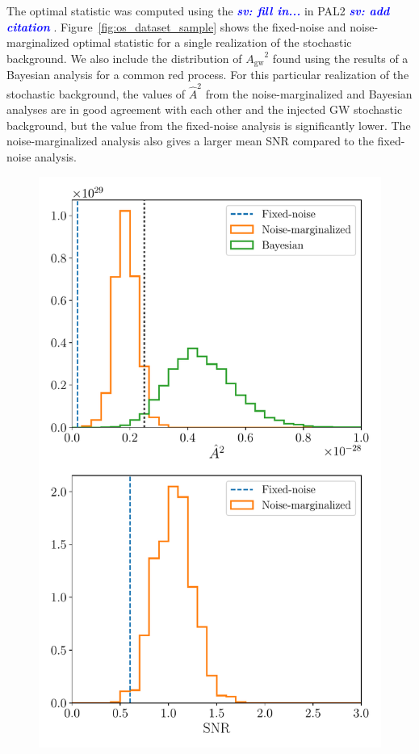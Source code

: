 \documentclass[twocolumn,aps,prd,superscriptaddress]{revtex4-1}
\newcommand{\sv}[1]{\textcolor{blue}{\it{\textbf{sv: #1}}} }
\newcommand{\Agw}{\ensuremath{A_\mathrm{gw}}}
\begin{document}
The optimal statistic was computed using the \sv{fill in...} in PAL2 \sv{add citation}. 
Figure~\ref{fig:os_dataset_sample} shows the fixed-noise and noise-marginalized 
optimal statistic for a single realization of the stochastic background. 
We also include the distribution of $\Agw^2$ found using the results of a Bayesian analysis 
for a common red process. For this particular realization of the stochastic background, 
the values of $\hat{A}^2$ from the noise-marginalized and Bayesian analyses are in good agreement 
with each other and the injected GW stochastic background, 
but the value from the fixed-noise analysis is significantly lower. 
The noise-marginalized analysis also gives a larger mean SNR compared to the fixed-noise analysis.
\begin{figure}[ht]
	\includegraphics[width=0.95\columnwidth]{plots/os_dataset50.pdf}

\end{figure}
\end{document}
